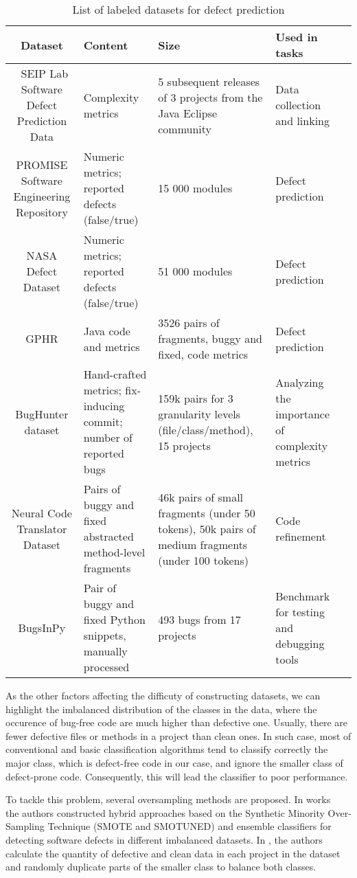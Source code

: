 \documentclass{article}
\begin{document}
\begin{table}[hbtp]
\footnotesize
\renewcommand{\arraystretch}{1.4}
\centering
\begin{tabulary}{1.0\textwidth}{|C|L|L|L|l}
\hline
Dataset & Content & Size & \parbox{10em}{Used in tasks}\\
\hline\
SEIP Lab Software Defect Prediction Data & Complexity metrics & 5 subsequent releases of 3 projects from the   Java Eclipse community & Data collection and linking \\ \hline
PROMISE Software Engineering Repository & Numeric metrics; reported defects (false/true) & 15 000 modules & Defect prediction \\ \hline
NASA Defect Dataset & Numeric metrics; reported defects (false/true) & 51 000 modules & Defect prediction \\ \hline
GPHR & Java code and metrics & 3526 pairs of fragments, buggy and fixed, code metrics & Defect prediction \\ \hline
BugHunter dataset & Hand-crafted metrics; fix-inducing commit; number of reported bugs & 159k pairs for 3 granularity levels (file/class/method), 15 projects & Analyzing the importance of complexity   metrics \\ \hline
Neural Code Translator Dataset & Pairs of buggy and fixed abstracted method-level fragments & 46k pairs of small fragments (under 50 tokens), 50k pairs of medium fragments (under 100 tokens) & Code refinement \\ \hline
BugsInPy & Pair of buggy and fixed Python snippets, manually processed & 493 bugs from 17 projects & Benchmark for testing and debugging tools \\ \hline
\end{tabulary}
\caption{List of labeled datasets for defect prediction}
\label{t2}
\end{table}

As the other factors affecting the difficuty of constructing datasets, we can highlight the imbalanced distribution of the classes in the data, where the occurence of bug-free code are much higher than defective one. Usually, there are fewer defective files or methods in a project than clean ones.
In such case, most of conventional and basic classification algorithms tend to classify correctly the major class,
which is defect-free code in our case, and ignore the smaller class of defect-prone code.
Consequently, this will lead the classifier to poor performance.

To tackle this problem, several oversampling methods are proposed. In works~\cite{AlsawalqahEtAl2017,AgrawalMenzies2018} the authors constructed hybrid approaches based on the Synthetic Minority Over-Sampling Technique (SMOTE and SMOTUNED) and ensemble classifiers for detecting software defects in different imbalanced datasets. In \cite{ShiEtAl2020}, the authors calculate the quantity of defective and clean data in each project in the dataset and randomly duplicate parts of the smaller class to balance both classes. 
\end{document}
